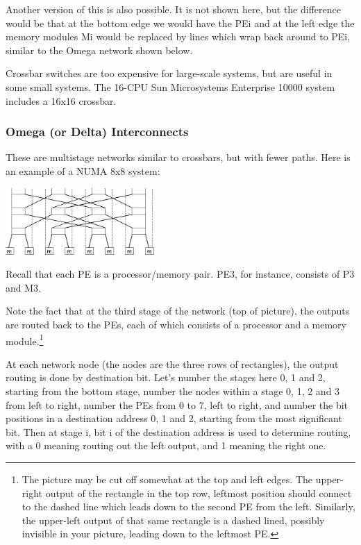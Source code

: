 Another version of this is also possible. It is not shown here, but the
difference would be that at the bottom edge we would have the PEi and at
the left edge the memory modules Mi would be replaced by lines which
wrap back around to PEi, similar to the Omega network shown below.

Crossbar switches are too expensive for large-scale systems, but are
useful in some small systems. The 16-CPU Sun Microsystems Enterprise
10000 system includes a 16x16 crossbar.

\subsubsection{Omega (or Delta) Interconnects}

These are multistage networks similar to crossbars, but with fewer
paths. Here is an example of a NUMA 8x8 system:

\par

\centerline{
\includegraphics[height=1.0in]{Images/Omega.jpg}
}

Recall that each PE is a processor/memory pair.  PE3, for instance,
consists of P3 and M3.

Note the fact that at the third stage of the network (top of picture),
the outputs are routed back to the PEs, each of which consists of a
processor and a memory module.\footnote{The picture may be cut off somewhat
at the top and left edges.  The upper-right output of the rectangle in
the top row, leftmost position should connect to the dashed line which
leads down to the second PE from the left.  Similarly, the upper-left
output of that same rectangle is a dashed lined, possibly invisible in
your picture, leading down to the leftmost PE.}

At each network node (the nodes are the three rows of rectangles), the
output routing is done by destination bit. Let's number the stages here
0, 1 and 2, starting from the bottom stage, number the nodes within a
stage 0, 1, 2 and 3 from left to right, number the PEs from 0 to 7, left
to right, and number the bit positions in a destination address 0, 1 and
2, starting from the most significant bit. Then at stage i, bit i of the
destination address is used to determine routing, with a 0 meaning
routing out the left output, and 1 meaning the right one.

